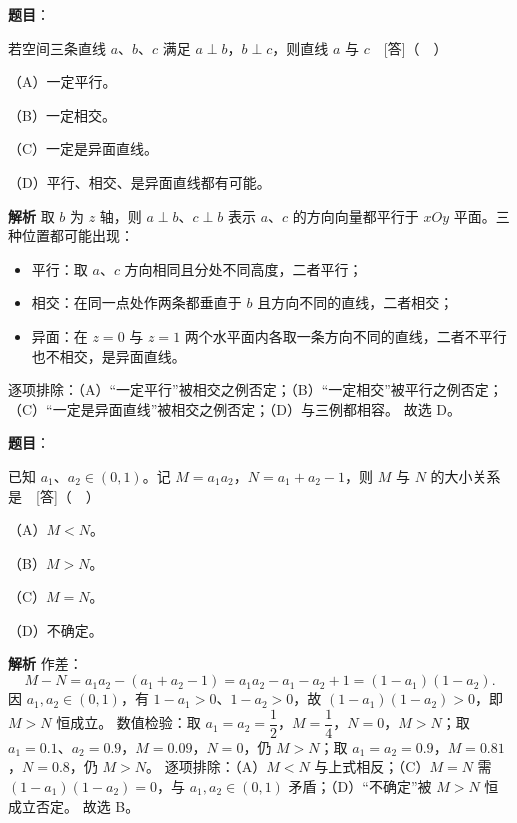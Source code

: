 \begin{answer}

\textbf{题目}：

若空间三条直线 $a$、$b$、$c$ 满足 $a\perp b$，$b\perp c$，则直线 $a$ 与 $c$　[答]（　）

（A）一定平行。

（B）一定相交。

（C）一定是异面直线。

（D）平行、相交、是异面直线都有可能。

\textbf{解析}
取 $b$ 为 $z$ 轴，则 $a\perp b$、$c\perp b$ 表示 $a$、$c$ 的方向向量都平行于 $xOy$ 平面。三种位置都可能出现：

\begin{itemize}
\item 平行：取 $a$、$c$ 方向相同且分处不同高度，二者平行；
\item 相交：在同一点处作两条都垂直于 $b$ 且方向不同的直线，二者相交；
\item 异面：在 $z=0$ 与 $z=1$ 两个水平面内各取一条方向不同的直线，二者不平行也不相交，是异面直线。
\end{itemize}
逐项排除：（A）“一定平行”被相交之例否定；（B）“一定相交”被平行之例否定；（C）“一定是异面直线”被相交之例否定；（D）与三例都相容。
故选 D。


\end{answer}
\begin{answer}

\textbf{题目}：

已知 $a_1$、$a_2\in(0,1)$。记 $M=a_1a_2$，$N=a_1+a_2-1$，则 $M$ 与 $N$ 的大小关系是　[答]（　）

（A）$M<N$。

（B）$M>N$。

（C）$M=N$。

（D）不确定。

\textbf{解析}
作差：
\nopagebreak[4]
\[M-N=a_1a_2-\left(a_1+a_2-1\right)=a_1a_2-a_1-a_2+1=\left(1-a_1\right)\left(1-a_2\right).\]
因 $a_1,a_2\in(0,1)$，有 $1-a_1>0$、$1-a_2>0$，故 $(1-a_1)(1-a_2)>0$，即 $M>N$ 恒成立。
数值检验：取 $a_1=a_2=\dfrac12$，$M=\dfrac14$，$N=0$，$M>N$；取 $a_1=0.1$、$a_2=0.9$，$M=0.09$，$N=0$，仍 $M>N$；取 $a_1=a_2=0.9$，$M=0.81$，$N=0.8$，仍 $M>N$。
逐项排除：（A）$M<N$ 与上式相反；（C）$M=N$ 需 $(1-a_1)(1-a_2)=0$，与 $a_1,a_2\in(0,1)$ 矛盾；（D）“不确定”被 $M>N$ 恒成立否定。
故选 B。


\end{answer}
